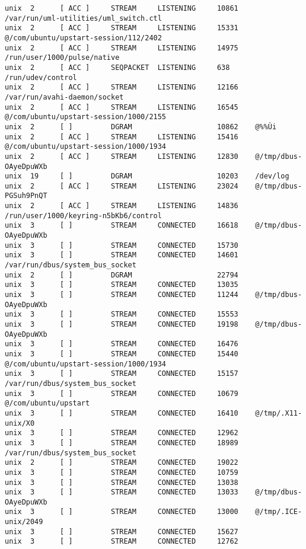 \begin{lstlisting}
unix  2      [ ACC ]     STREAM     LISTENING     10861    /var/run/uml-utilities/uml_switch.ctl
unix  2      [ ACC ]     STREAM     LISTENING     15331    @/com/ubuntu/upstart-session/112/2402
unix  2      [ ACC ]     STREAM     LISTENING     14975    /run/user/1000/pulse/native
unix  2      [ ACC ]     SEQPACKET  LISTENING     638      /run/udev/control
unix  2      [ ACC ]     STREAM     LISTENING     12166    /var/run/avahi-daemon/socket
unix  2      [ ACC ]     STREAM     LISTENING     16545    @/com/ubuntu/upstart-session/1000/2155
unix  2      [ ]         DGRAM                    10862    @%%Ùi
unix  2      [ ACC ]     STREAM     LISTENING     15416    @/com/ubuntu/upstart-session/1000/1934
unix  2      [ ACC ]     STREAM     LISTENING     12830    @/tmp/dbus-OAyeDpuWXb
unix  19     [ ]         DGRAM                    10203    /dev/log
unix  2      [ ACC ]     STREAM     LISTENING     23024    @/tmp/dbus-PGSuh9PnQT
unix  2      [ ACC ]     STREAM     LISTENING     14836    /run/user/1000/keyring-n5bKb6/control
unix  3      [ ]         STREAM     CONNECTED     16618    @/tmp/dbus-OAyeDpuWXb
unix  3      [ ]         STREAM     CONNECTED     15730    
unix  3      [ ]         STREAM     CONNECTED     14601    /var/run/dbus/system_bus_socket
unix  2      [ ]         DGRAM                    22794    
unix  3      [ ]         STREAM     CONNECTED     13035    
unix  3      [ ]         STREAM     CONNECTED     11244    @/tmp/dbus-OAyeDpuWXb
unix  3      [ ]         STREAM     CONNECTED     15553    
unix  3      [ ]         STREAM     CONNECTED     19198    @/tmp/dbus-OAyeDpuWXb
unix  3      [ ]         STREAM     CONNECTED     16476    
unix  3      [ ]         STREAM     CONNECTED     15440    @/com/ubuntu/upstart-session/1000/1934
unix  3      [ ]         STREAM     CONNECTED     15157    /var/run/dbus/system_bus_socket
unix  3      [ ]         STREAM     CONNECTED     10679    @/com/ubuntu/upstart
unix  3      [ ]         STREAM     CONNECTED     16410    @/tmp/.X11-unix/X0
unix  3      [ ]         STREAM     CONNECTED     12962    
unix  3      [ ]         STREAM     CONNECTED     18989    /var/run/dbus/system_bus_socket
unix  2      [ ]         STREAM     CONNECTED     19022    
unix  3      [ ]         STREAM     CONNECTED     10759    
unix  3      [ ]         STREAM     CONNECTED     13038    
unix  3      [ ]         STREAM     CONNECTED     13033    @/tmp/dbus-OAyeDpuWXb
unix  3      [ ]         STREAM     CONNECTED     13000    @/tmp/.ICE-unix/2049
unix  3      [ ]         STREAM     CONNECTED     15627    
unix  3      [ ]         STREAM     CONNECTED     12762    

\end{lstlisting}
